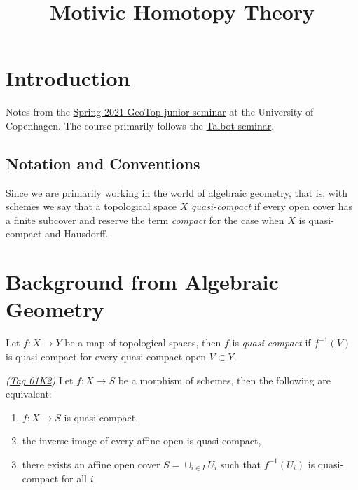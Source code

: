 \documentclass[12pt]{article}
\numberwithin{equation}{section}
\numberwithin{lemma}{section}
\numberwithin{theorem}{section}
\numberwithin{proposition}{section}
\numberwithin{corollary}{section}
\numberwithin{definition}{section}
\numberwithin{example}{section}
\numberwithin{remark}{section}
\newcommand{\name}{}
\newcommand{\thedate}{}
\newcommand{\course}{Motivic Homotopy Theory}
\newcommand{\assignment}{}
\begin{document}
\title{\course\\ \assignment}
\author{\name{}}
\date{\thedate}
\maketitle

\tableofcontents


\section*{Introduction}

Notes from the
\href{https://sites.google.com/view/maxime-ramzi-en/geotop-junior-seminar?authuser=0}{Spring
  2021 GeoTop junior seminar} at the University of Copenhagen. The
course primarily follows the
\href{https://math.mit.edu/events/talbot/index.php?year=2014}{Talbot
  seminar}.

\subsection*{Notation and Conventions}

Since we are primarily working in the world of algebraic geometry,
that is, with schemes we say that a topological space $X$
\emph{quasi-compact} if every open cover has a finite subcover and
reserve the term \emph{compact} for the case when $X$ is quasi-compact
and Hausdorff.

\section{Background from Algebraic Geometry}

\begin{definition}
  Let $f : X \to Y$ be a map of topological spaces, then $f$ is
  \emph{quasi-compact} if $f^{-1}(V)$ is quasi-compact for every
  quasi-compact open $V \subset Y$.
\end{definition}

\begin{lemma}{\emph{(\href{https://stacks.math.columbia.edu/tag/01K2}{Tag 01K2})}}
  Let $f : X \to S$ be a morphism of schemes, then the following are
  equivalent:
  \begin{enumerate}[label=(\arabic*)]
  \item $f : X \to S$ is quasi-compact,
  \item the inverse image of every affine open is quasi-compact,
  \item there exists an affine open cover $S = \cup_{i \in I} U_i$
    such that $f^{-1}(U_i)$ is quasi-compact for all $i$.
  \end{enumerate}
\end{lemma}
\end{document}
